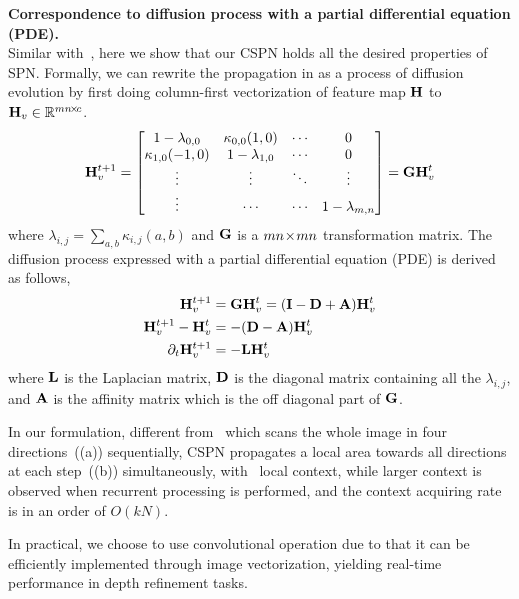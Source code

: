 \noindent\textbf{Correspondence to diffusion process with a partial differential equation (PDE).} \\
Similar with~\cite{liu2017learning}, here we show that our CSPN holds all the desired properties of SPN.
Formally, we can rewrite the propagation in  as a process of diffusion evolution by first doing column-first vectorization of feature map ${\mathbf H}$ to ${\mathbf H}_v \in {\mathbb R}^{mn \! \times \! c}$.
\begin{align}
     {\mathbf H}_v^{t+1} = 
     \begin{bmatrix}
    1-\lambda_{0, 0}  & \kappa_{0,0}(1,0) & \cdots & 0 \\
    \kappa_{1,0}(-1,0)   & 1-\lambda_{1, 0} & \cdots & 0 \\
    \vdots & \vdots & \ddots & \vdots \\
    \vdots & \cdots & \cdots & 1-\lambda_{m,n} \\
\end{bmatrix} = {\mathbf G}{\mathbf H}_v^{t}
\label{eqn:vector}
\end{align}
where $\lambda_{i, j} = \sum_{a,b}\kappa_{i,j}(a,b)$ and ${\mathbf G}$ is a $mn \! \times \! mn$ transformation matrix. The diffusion process expressed with a partial differential equation (PDE) is derived as follows, 
\begin{align}
     {\mathbf H}_v^{t+1} &= {\mathbf G}{\mathbf H}_v^{t} = ({\mathbf I} - {\mathbf D} + {\mathbf A}){\mathbf H}_v^{t} \nonumber\\
     {\mathbf H}_v^{t+1} - {\mathbf H}_v^{t} &= - ({\mathbf D} - {\mathbf A}) {\mathbf H}_v^{t} \nonumber\\
     \partial_t {\mathbf H}_v^{t+1} &= -{\mathbf L}{\mathbf H}_v^{t}
\label{eqn:proof}
\end{align}
where ${\mathbf L}$ is the Laplacian matrix, ${\mathbf D}$ is the diagonal matrix containing all the $\lambda_{i, j}$, and ${\mathbf A}$ is the affinity matrix which is the off diagonal part of ${\mathbf G}$.

In our formulation, different from~\cite{liu2017learning} which scans the whole image in four directions~((a)) sequentially, CSPN propagates a local area towards all directions at each step~((b)) simultaneously, \ie with~ local context, while larger context is observed when recurrent processing is performed, and the context acquiring rate is in an order of $O(kN)$.

In practical, we choose to use convolutional operation due to that it can be efficiently implemented through image vectorization, yielding real-time performance in depth refinement tasks.

